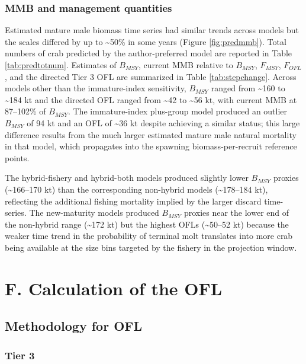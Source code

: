 \documentclass[
]{article}
\begin{document}
\subsubsection{MMB and management quantities}\label{mmb-and-management-quantities}

Estimated mature male biomass time series had similar trends across models but the scales differed by up to \textasciitilde50\% in some years (Figure \ref{fig:predmmb}). Total numbers of crab predicted by the author-preferred model are reported in Table \ref{tab:predtotnum}. Estimates of \(B_{MSY}\), current MMB relative to \(B_{MSY}\), \(F_{MSY}\), \(F_{OFL}\), and the directed Tier 3 OFL are summarized in Table \ref{tab:stepchange}. Across models other than the immature-index sensitivity, \(B_{MSY}\) ranged from \textasciitilde160 to \textasciitilde184 kt and the directed OFL ranged from \textasciitilde42 to \textasciitilde56 kt, with current MMB at 87--102\% of \(B_{MSY}\). The immature-index plus-group model produced an outlier \(B_{MSY}\) of 94 kt and an OFL of \textasciitilde36 kt despite achieving a similar status; this large difference results from the much larger estimated mature male natural mortality in that model, which propagates into the spawning biomass-per-recruit reference points.

The hybrid-fishery and hybrid-both models produced slightly lower \(B_{MSY}\) proxies (\textasciitilde166--170 kt) than the corresponding non-hybrid models (\textasciitilde178--184 kt), reflecting the additional fishing mortality implied by the larger discard time-series. The new-maturity models produced \(B_{MSY}\) proxies near the lower end of the non-hybrid range (\textasciitilde172 kt) but the highest OFLs (\textasciitilde50--52 kt) because the weaker time trend in the probability of terminal molt translates into more crab being available at the size bins targeted by the fishery in the projection window.

\section{F. Calculation of the OFL}\label{f.-calculation-of-the-ofl}

\subsection{Methodology for OFL}\label{methodology-for-ofl}

\subsubsection{Tier 3}\label{tier-3}
\end{document}
